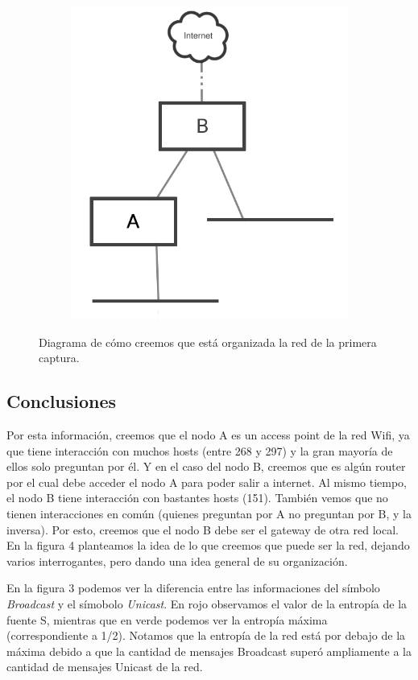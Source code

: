 \begin{figure}[h]
  \begin{subfigure}{.5\textwidth}
    \includegraphics[width=\textwidth]{imagenes/laboratorio/red.png}
  \end{subfigure}
  \label{fig:exp1_labo_red}
  \caption{Diagrama de cómo creemos que está organizada la red de la primera captura.}
\end{figure}

\subsection{Conclusiones}

\par Por esta información, creemos que el nodo A es un access point de la red Wifi, ya que tiene interacción con muchos hosts (entre 268 y 297) y la gran mayoría de ellos solo preguntan por él. Y en el caso del nodo B, creemos que es algún router por el cual debe acceder el nodo A para poder salir a internet. Al mismo tiempo, el nodo B tiene interacción con bastantes hosts (151). También vemos que no tienen interacciones en común (quienes preguntan por A no preguntan por B, y la inversa). Por esto, creemos que el nodo B debe ser el gateway de otra red local. En la figura 4 planteamos la idea de lo que creemos que puede ser la red, dejando varios interrogantes, pero dando una idea general de su organización.

\par En la figura 3 podemos ver la diferencia entre las informaciones del símbolo \textit{Broadcast} y el símobolo \textit{Unicast}. En rojo observamos el valor de la entropía de la fuente S, mientras que en verde podemos ver la entropía máxima (correspondiente a 1/2). Notamos que la entropía de la red está por debajo de la máxima debido a que la cantidad de mensajes Broadcast superó ampliamente a la cantidad de mensajes Unicast de la red.
